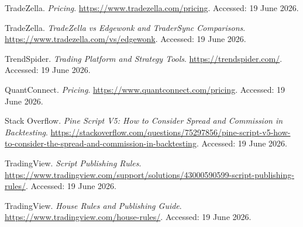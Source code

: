 \documentclass[11pt,a4paper]{article}
\begin{document}
{\begin{enumerate}[leftmargin=1.7em,itemsep=.15em,label={[\arabic*]}]
\item TradeZella. \emph{Pricing}. \url{https://www.tradezella.com/pricing}. Accessed: 19 June 2026.
\item TradeZella. \emph{TradeZella vs Edgewonk and TraderSync Comparisons}. \url{https://www.tradezella.com/vs/edgewonk}. Accessed: 19 June 2026.
\item TrendSpider. \emph{Trading Platform and Strategy Tools}. \url{https://trendspider.com/}. Accessed: 19 June 2026.
\item QuantConnect. \emph{Pricing}. \url{https://www.quantconnect.com/pricing}. Accessed: 19 June 2026.
\item Stack Overflow. \emph{Pine Script V5: How to Consider Spread and Commission in Backtesting}. \url{https://stackoverflow.com/questions/75297856/pine-script-v5-how-to-consider-the-spread-and-commission-in-backtesting}. Accessed: 19 June 2026.
\item TradingView. \emph{Script Publishing Rules}. \url{https://www.tradingview.com/support/solutions/43000590599-script-publishing-rules/}. Accessed: 19 June 2026.
\item TradingView. \emph{House Rules and Publishing Guide}. \url{https://www.tradingview.com/house-rules/}. Accessed: 19 June 2026.
\end{enumerate}}
\end{document}

